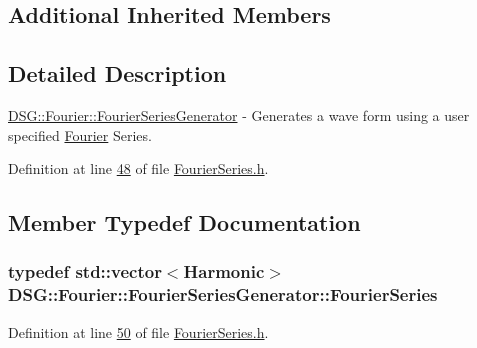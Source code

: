 \subsection*{Additional Inherited Members}


\subsection{Detailed Description}
\hyperlink{class_d_s_g_1_1_fourier_1_1_fourier_series_generator}{D\+S\+G\+::\+Fourier\+::\+Fourier\+Series\+Generator} -\/ Generates a wave form using a user specified \hyperlink{namespace_d_s_g_1_1_fourier}{Fourier} Series. 

Definition at line \hyperlink{_fourier_series_8h_source_l00048}{48} of file \hyperlink{_fourier_series_8h_source}{Fourier\+Series.\+h}.



\subsection{Member Typedef Documentation}
\hypertarget{class_d_s_g_1_1_fourier_1_1_fourier_series_generator_a32ffe02b67ac07db92ad41e3ee366c94}{
\subsubsection[{Fourier\+Series}]{\setlength{\rightskip}{0pt plus 5cm}typedef std\+::vector$<${\bf Harmonic}$>$ {\bf D\+S\+G\+::\+Fourier\+::\+Fourier\+Series\+Generator\+::\+Fourier\+Series}}}\label{class_d_s_g_1_1_fourier_1_1_fourier_series_generator_a32ffe02b67ac07db92ad41e3ee366c94}


Definition at line \hyperlink{_fourier_series_8h_source_l00050}{50} of file \hyperlink{_fourier_series_8h_source}{Fourier\+Series.\+h}.



